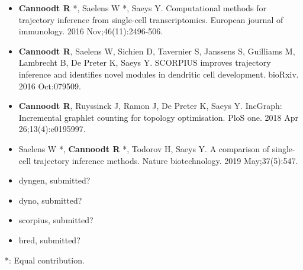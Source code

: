 \begin{itemize}
	\item \textbf{Cannoodt R} *, Saelens W *, Saeys Y. Computational methods for trajectory inference from single-cell transcriptomics. European journal of immunology. 2016 Nov;46(11):2496-506.
	\item \textbf{Cannoodt R}, Saelens W, Sichien D, Tavernier S, Janssens S, Guilliams M, Lambrecht B, De Preter K, Saeys Y. SCORPIUS improves trajectory inference and identifies novel modules in dendritic cell development. bioRxiv. 2016 Oct:079509.
	\item \textbf{Cannoodt R}, Ruyssinck J, Ramon J, De Preter K, Saeys Y. IncGraph: Incremental graphlet counting for topology optimisation. PloS one. 2018 Apr 26;13(4):e0195997.
  \item Saelens W *, \textbf{Cannoodt R} *, Todorov H, Saeys Y. A comparison of single-cell trajectory inference methods. Nature biotechnology. 2019 May;37(5):547.
  \item dyngen, submitted?
  \item dyno, submitted?
  \item scorpius, submitted?
  \item bred, submitted?
 \end{itemize}

*: Equal contribution.

